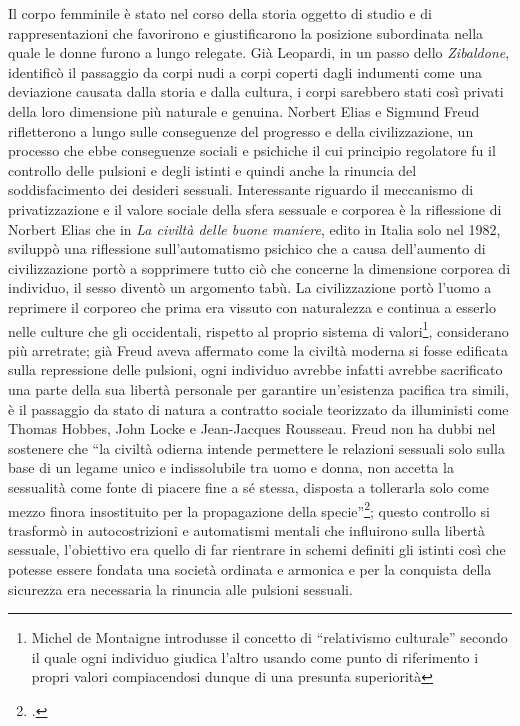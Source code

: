 Il corpo femminile è stato nel corso della storia oggetto di studio e di rappresentazioni che favorirono e giustificarono la posizione subordinata nella quale le donne furono a lungo relegate.
Già Leopardi, in un passo dello \textit{Zibaldone}, identificò il passaggio da corpi nudi a corpi coperti dagli indumenti come una deviazione causata dalla storia e dalla cultura, i corpi sarebbero stati così privati della loro dimensione più naturale e genuina.
Norbert Elias e Sigmund Freud rifletterono a lungo sulle conseguenze del progresso e della civilizzazione, un processo che ebbe conseguenze sociali e psichiche il cui principio regolatore fu il controllo delle pulsioni e degli istinti e quindi anche la rinuncia del soddisfacimento dei desideri sessuali.
Interessante riguardo il meccanismo di privatizzazione e il valore sociale della sfera sessuale e corporea è la riflessione di Norbert Elias che in \textit{La civiltà delle buone maniere}, edito in Italia solo nel 1982, sviluppò una riflessione sull'automatismo psichico che a causa dell'aumento di civilizzazione portò a sopprimere tutto ciò che concerne la dimensione corporea di individuo, il sesso diventò un argomento tabù. 
La civilizzazione portò l'uomo a reprimere il corporeo che prima era vissuto con naturalezza e continua a esserlo nelle culture che gli occidentali, rispetto al proprio sistema di valori\footnote{Michel de Montaigne introdusse il concetto di \enquote{relativismo culturale} secondo il quale ogni individuo giudica l'altro usando come punto di riferimento i propri valori compiacendosi dunque di una presunta superiorità}, considerano più arretrate; già Freud aveva affermato come la civiltà moderna si fosse edificata sulla repressione delle pulsioni, ogni individuo avrebbe infatti avrebbe sacrificato una parte della sua libertà personale per garantire un'esistenza pacifica tra simili, è il passaggio da stato di natura a contratto sociale teorizzato da illuministi come Thomas Hobbes, John Locke e Jean-Jacques Rousseau.
Freud non ha dubbi nel sostenere che \enquote{la civiltà odierna intende permettere le relazioni sessuali solo sulla base di un legame unico e indissolubile tra uomo e donna, non accetta la sessualità come fonte di piacere fine a sé stessa, disposta a tollerarla solo come mezzo finora insostituito per la propagazione della specie}\footcite{Freud}; questo controllo si trasformò in autocostrizioni e automatismi mentali che influirono sulla libertà sessuale, l'obiettivo era quello di far rientrare in schemi definiti gli istinti così che potesse essere fondata una società ordinata e armonica e per la conquista della sicurezza era necessaria la rinuncia alle pulsioni sessuali.
